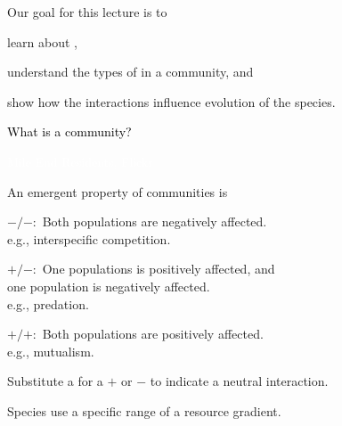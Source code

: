 \documentclass[t]{beamer}
\newcommand*\myaddplot[4]{
    \addplot+ [thick, name path=#1,domain=#2-\factor*#3:#2+\factor*#3, color=#4] {normal(#2,#3)};
}
\begin{document}

\begin{frame}{Our goal for this lecture is to}

	\hangpara learn about ,
	
	\hangpara understand the types of  in a community, and
	
	\hangpara show how the interactions influence evolution of the species.
	
\end{frame}
%
{
\begin{frame}[b]{\textcolor{black}{What is a \textcolor{orange6}{community?} }}

	\tiny \textcolor{white}{Mile End Residents, Flickr }

\end{frame}
}

\begin{frame}[t]{An emergent property of communities is }

\hangpara $- \slash -:$ Both populations are negatively affected.\\
	\hspace{\widthof{$- \slash -:$}} e.g., interspecific competition.

\hangpara $+ \slash -:$ One populations is positively affected, and\\
	 \hspace{\widthof{$- \slash -:$}} one population is negatively affected.\\
	\hspace{\widthof{$- \slash -:$}} e.g., predation.

\hangpara $+ \slash +:$ Both populations are positively affected.\\
	\hspace{\widthof{$+ \slash +:$}} e.g., mutualism.


\hangpara Substitute a {} for a $+$ or $-$ to indicate a neutral interaction.

\end{frame}
%
\begin{frame}[t]{Species use a specific range of a resource gradient.}
	\centering 
\end{frame}
%
\end{document}
